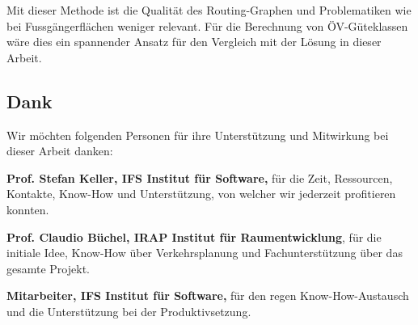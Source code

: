 Mit dieser Methode ist die Qualität des Routing-Graphen und Problematiken wie bei Fussgängerflächen weniger relevant.
Für die Berechnung von \acs{ÖV}-Güteklassen wäre dies ein spannender Ansatz für den Vergleich mit der Lösung in dieser Arbeit.



\subsection{Dank}
\label{Resultate:Dank}

Wir möchten folgenden Personen für ihre Unterstützung und Mitwirkung bei dieser Arbeit danken:

\textbf{Prof. Stefan Keller, IFS Institut für Software,} für die Zeit, Ressourcen, Kontakte, Know-How und Unterstützung, von welcher wir jederzeit profitieren konnten.

\textbf{Prof. Claudio Büchel, IRAP Institut für Raumentwicklung}, für die initiale Idee, Know-How über Verkehrsplanung und Fachunterstützung über das gesamte Projekt.

\textbf{Mitarbeiter, IFS Institut für Software,} für den regen Know-How-Austausch und die Unterstützung bei der Produktivsetzung.
